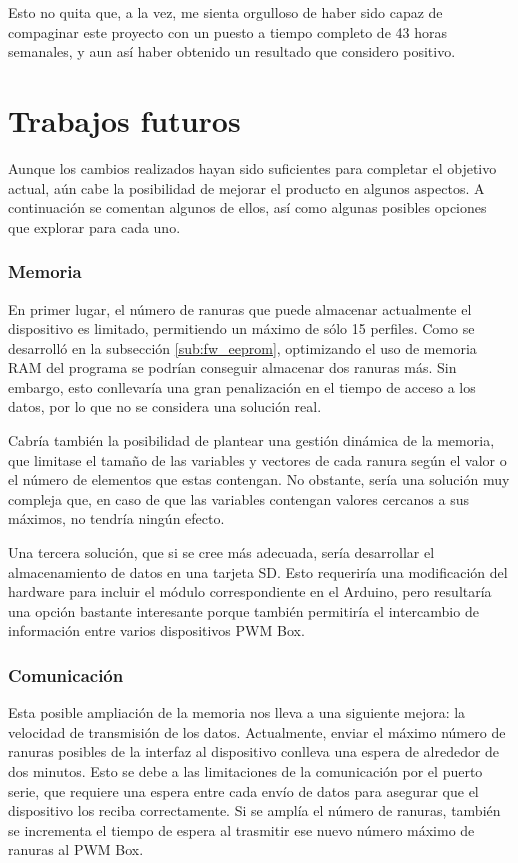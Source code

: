 Esto no quita que, a la vez, me sienta orgulloso de haber sido capaz de compaginar este proyecto con un puesto a tiempo completo de 43 horas semanales, y aun así haber obtenido un resultado que considero positivo.

\section{Trabajos futuros}

Aunque los cambios realizados hayan sido suficientes para completar el objetivo actual, aún cabe la posibilidad de mejorar el producto en algunos aspectos. A continuación se comentan algunos de ellos, así como algunas posibles opciones que explorar para cada uno.

\subsubsection{Memoria}

En primer lugar, el número de ranuras que puede almacenar actualmente el dispositivo es limitado, permitiendo un máximo de sólo 15 perfiles. Como se desarrolló en la subsección \ref{sub:fw_eeprom}, optimizando el uso de memoria RAM del programa se podrían conseguir almacenar dos ranuras más. Sin embargo, esto conllevaría una gran penalización en el tiempo de acceso a los datos, por lo que no se considera una solución real.

Cabría también la posibilidad de plantear una gestión dinámica de la memoria, que limitase el tamaño de las variables y vectores de cada ranura según el valor o el número de elementos que estas contengan. No obstante, sería una solución muy compleja que, en caso de que las variables contengan valores cercanos a sus máximos, no tendría ningún efecto.

Una tercera solución, que si se cree más adecuada, sería desarrollar el almacenamiento de datos en una tarjeta SD. Esto requeriría una modificación del hardware para incluir el módulo correspondiente en el Arduino, pero resultaría una opción bastante interesante porque también permitiría el intercambio de información entre varios dispositivos PWM Box.

\subsubsection{Comunicación}

Esta posible ampliación de la memoria nos lleva a una siguiente mejora: la velocidad de transmisión de los datos. Actualmente, enviar el máximo número de ranuras posibles de la interfaz al dispositivo conlleva una espera de alrededor de dos minutos. Esto se debe a las limitaciones de la comunicación por el puerto serie, que requiere una espera entre cada envío de datos para asegurar que el dispositivo los reciba correctamente. Si se amplía el número de ranuras, también se incrementa el tiempo de espera al trasmitir ese nuevo número máximo de ranuras al PWM Box.

